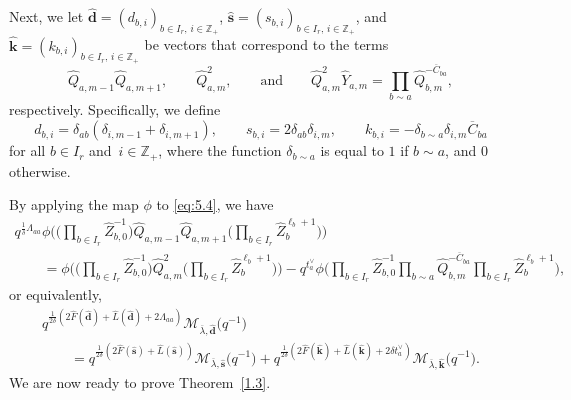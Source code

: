 \documentclass[10pt,a4paper]{amsart}
\numberwithin{equation}{section}
\begin{document}
Next, we let $\widehat{\mathbf{d}}=(d_{b,i})_{b\in I_r,\,i\in\mathbb{Z}_+}$, $\widehat{\mathbf{s}}=(s_{b,i})_{b\in I_r,\, i\in\mathbb{Z}_+}$, and $\widehat{\mathbf{k}}=(k_{b,i})_{b\in I_r,\,i\in\mathbb{Z}_+}$ be vectors that correspond to the terms
\[
\widehat{Q}_{a,m-1}\widehat{Q}_{a,m+1} , \qquad \widehat{Q}_{a,m}^2, \qquad \text{and}\qquad
\widehat{Q}_{a,m}^2\widehat{Y}_{a,m}=\prod_{b\sim a}\widehat{Q}_{b,m}^{-\overline{C}_{ba}},
\]
 respectively. Specifically, we define
\[
d_{b,i}
=\delta_{ab}(\delta_{i,m-1}+\delta_{i,m+1}), \qquad
s_{b,i}
=2\delta_{ab}\delta_{i,m} , \qquad
k_{b,i}
=-\delta_{b\sim a}\delta_{i,m}\overline{C}_{ba}
\]
for all $b\in I_r$ and~${i\in\mathbb{Z}_+}$, where the function $\delta_{b\sim a}$ is equal to $1$ if $b\sim a$, and $0$ otherwise.

By applying the map $\phi$ to \eqref{eq:5.4}, we have
\begin{gather*}
q^{\frac{1}{\delta}\Lambda_{aa}}\phi\biggl(\biggl(\prod_{b\in I_r}\widehat{Z}_{b,0}^{-1}\biggr)\widehat{Q}_{a,m-1}\widehat{Q}_{a,m+1}\biggl(\prod_{b\in I_r}\widehat{Z}_b^{\ell_b+1}\biggr)\biggr)\\
\qquad=\phi\biggl(\biggl(\prod_{b\in I_r}\widehat{Z}_{b,0}^{-1}\biggr)\widehat{Q}_{a,m}^2\biggl(\prod_{b\in I_r}\widehat{Z}_b^{\ell_b+1}\biggr)\biggr)
-q^{t_a^{\vee}}\phi\biggl(\prod_{b\in I_r}\widehat{Z}_{b,0}^{-1}\prod_{b\sim a}\widehat{Q}_{b,m}^{-\overline{C}_{ba}}\prod_{b\in I_r}\widehat{Z}_b^{\ell_b+1}\biggr),
\end{gather*}
or equivalently,
\begin{gather}
q^{\frac{1}{2\delta}(2\widehat{F}(\widehat{\mathbf{d}})+\widehat{L}(\widehat{\mathbf{d}})+2\Lambda_{aa})}
\mathcal{M}_{\overline{\lambda},\widehat{\mathbf{d}}}\bigl(q^{-1}\bigr)\nonumber\\
\qquad
=q^{\frac{1}{2\delta}(2\widehat{F}(\widehat{\mathbf{s}})+\widehat{L}(\widehat{\mathbf{s}}))}\mathcal{M}_{\overline{\lambda},\widehat{\mathbf{s}}}\bigl(q^{-1}\bigr)
+q^{\frac{1}{2\delta}(2\widehat{F}(\widehat{\mathbf{k}})+\widehat{L}(\widehat{\mathbf{k}})+2\delta t_a^{\vee})}\mathcal{M}_{\overline{\lambda},\widehat{\mathbf{k}}}\bigl(q^{-1}\bigr).\label{eq:5.8}
\end{gather}
We are now ready to prove Theorem~\ref{1.3}.
\end{document}
